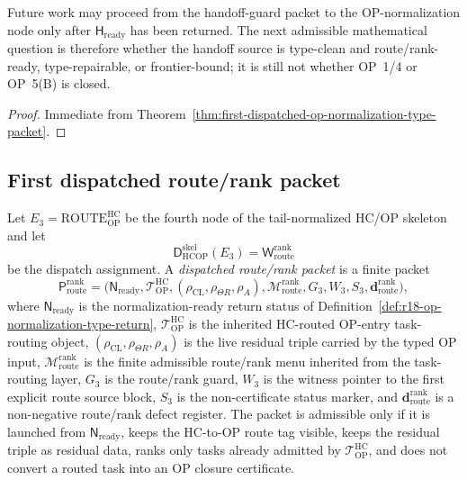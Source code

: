 \begin{corollary}
\label{cor:v3340-r18-working-rule}
Future work may proceed from the handoff-guard packet to the OP-normalization node only after \(\mathsf H_{\mathrm{ready}}\) has been returned. The next admissible mathematical question is therefore whether the handoff source is type-clean and route/rank-ready, type-repairable, or frontier-bound; it is still not whether OP~1/4 or OP~5(B) is closed.
\end{corollary}

\begin{proof}
Immediate from Theorem~\ref{thm:first-dispatched-op-normalization-type-packet}.
\end{proof}
\subsection{First dispatched route/rank packet}
\label{subsec:first-dispatched-route-rank-packet}

\begin{definition}
\label{def:dispatched-route-rank-packet}
Let \(E_3=\mathrm{ROUTE}_{\mathrm{OP}}^{\mathrm{HC}}\) be the fourth node of the tail-normalized HC/OP skeleton and let
\[
 \mathsf D_{\mathrm{HCOP}}^{\mathrm{skel}}(E_3)
 =
 \mathsf W_{\mathrm{route}}^{\mathrm{rank}}
\]
be the dispatch assignment. A \emph{dispatched route/rank packet} is a finite packet
\[
 \mathsf P_{\mathrm{route}}^{\mathrm{rank}}
 =
 \bigl(\mathsf N_{\mathrm{ready}},\mathcal T_{\mathrm{OP}}^{\mathrm{HC}},
 (\rho_{\mathrm{CL}},\rho_{\Theta R},\rho_A),
 \mathcal M_{\mathrm{route}}^{\mathrm{rank}},G_3,W_3,S_3,
 \mathbf d_{\mathrm{route}}^{\mathrm{rank}}\bigr),
\]
where \(\mathsf N_{\mathrm{ready}}\) is the normalization-ready return status of Definition~\ref{def:r18-op-normalization-type-return}, \(\mathcal T_{\mathrm{OP}}^{\mathrm{HC}}\) is the inherited HC-routed OP-entry task-routing object, \((\rho_{\mathrm{CL}},\rho_{\Theta R},\rho_A)\) is the live residual triple carried by the typed OP input, \(\mathcal M_{\mathrm{route}}^{\mathrm{rank}}\) is the finite admissible route/rank menu inherited from the task-routing layer, \(G_3\) is the route/rank guard, \(W_3\) is the witness pointer to the first explicit route source block, \(S_3\) is the non-certificate status marker, and \(\mathbf d_{\mathrm{route}}^{\mathrm{rank}}\) is a non-negative route/rank defect register. The packet is admissible only if it is launched from \(\mathsf N_{\mathrm{ready}}\), keeps the HC-to-OP route tag visible, keeps the residual triple as residual data, ranks only tasks already admitted by \(\mathcal T_{\mathrm{OP}}^{\mathrm{HC}}\), and does not convert a routed task into an OP closure certificate.
\end{definition}

